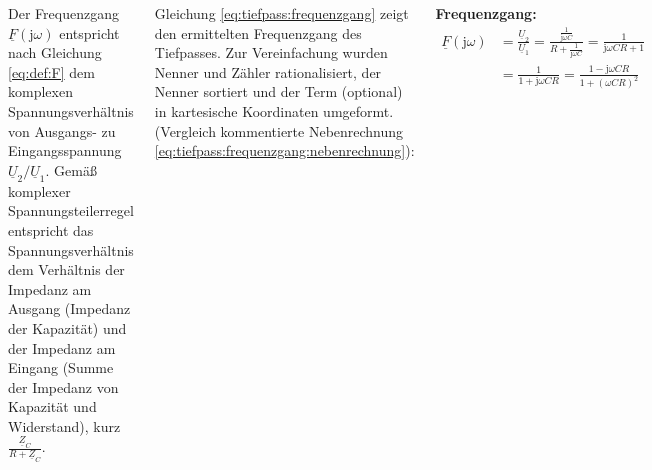 \begin{frame}[t]
\begin{columns}[T]
{        Der Frequenzgang $\underline{F}(\mathrm{j}\omega)$ entspricht nach Gleichung \ref{eq:def:F} 
        dem komplexen Spannungsverhältnis von Ausgangs- zu Eingangsspannung $\underline{U}_2/\underline{U}_1$.
        Gemäß komplexer Spannungsteilerregel entspricht das Spannungsverhältnis dem Verhältnis der Impedanz am Ausgang (Impedanz der Kapazität) und 
        der Impedanz am Eingang (Summe der Impedanz von Kapazität und Widerstand), kurz $\frac{\underline{Z}_C}{R + \underline{Z}_C}$.

        Gleichung \ref{eq:tiefpass:frequenzgang} zeigt den ermittelten Frequenzgang des Tiefpasses.
        Zur Vereinfachung wurden Nenner und Zähler rationalisiert, der Nenner sortiert und der Term
        (optional) in kartesische Koordinaten umgeformt. (Vergleich kommentierte Nebenrechnung \ref{eq:tiefpass:frequenzgang:nebenrechnung}):
    }%
    \b{%
        \textbf{Frequenzgang:}%
        \begin{align}%
            \underline{F}(\mathrm{j}\omega)   & = \frac{\underline{U}_2}{\underline{U}_1} 
                                    = \frac{\frac{1}{\mathrm{j}\omega C}}{R + \frac{1}{\mathrm{j}\omega C}}
                                    = \frac{1}{\mathrm{j}\omega CR + 1} \\
                                    & = \frac{1}{1 + \mathrm{j}\omega CR}
                                    = \frac{1 - \mathrm{j}\omega CR}{1 + (\omega CR)^2}
        \end{align}%
        \pause%
    }%

\end{columns}
\end{frame}
